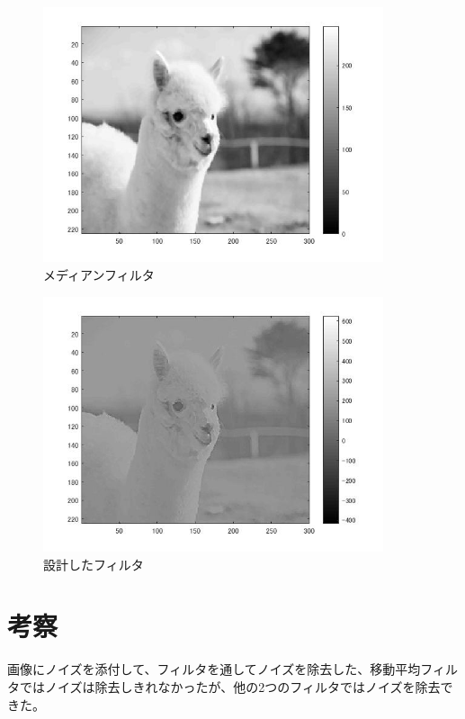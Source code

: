 \documentclass{jsarticle}
\begin{document}
\newpage
\begin{figure}[htbp]
 \begin{center}
  \includegraphics[width=10cm]{8-3.jpg}
 \end{center}
 \caption{メディアンフィルタ}
\end{figure}

\newpage
\begin{figure}[htbp]
 \begin{center}
  \includegraphics[width=10cm]{8-4.jpg}
 \end{center}
 \caption{設計したフィルタ}
\end{figure}

\section{考察}
画像にノイズを添付して、フィルタを通してノイズを除去した、移動平均フィルタではノイズは除去しきれなかったが、他の2つのフィルタではノイズを除去できた。
\end{document}
